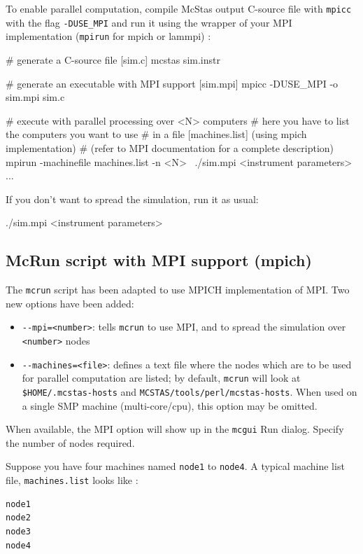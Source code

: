To enable parallel computation, compile McStas output C-source file
with \verb'mpicc' with the flag \verb'-DUSE_MPI' and run it using the
wrapper of your MPI implementation (\verb'mpirun' for mpich or lammpi) :
\begin{bash}
  # generate a C-source file [sim.c]
  mcstas sim.instr

  # generate an executable with MPI support [sim.mpi]
  mpicc -DUSE_MPI -o sim.mpi sim.c

  # execute with parallel processing over <N> computers
  # here you have to list the computers you want to use
  # in a file [machines.list] (using mpich implementation)
  # (refer to MPI documentation for a complete description)
  mpirun -machinefile machines.list -n <N> \
         ./sim.mpi <instrument parameters>
  ...
\end{bash}

If you don't want to spread the simulation, run it as usual:
\begin{bash}
  ./sim.mpi <instrument parameters>
\end{bash}

\subsection{McRun script with MPI support (mpich)}

The \verb'mcrun' script has been adapted to use MPICH implementation
of MPI. Two new options have been added:
\begin{itemize}
\item \verb'--mpi=<number>': tells \verb'mcrun' to use MPI, and to
  spread the simulation over \verb'<number>' nodes
\item \verb'--machines=<file>': defines a text file where the nodes which are to
  be used for parallel computation are listed; by default, \verb'mcrun' will
  look at \verb'$HOME/.mcstas-hosts' and
  \verb'MCSTAS/tools/perl/mcstas-hosts'. When used on a single SMP machine
  (multi-core/cpu), this option may be omitted.
\end{itemize}
When available, the MPI option will show up in the \verb+mcgui+ Run
dialog. Specify the number of nodes required.

Suppose you have four machines named \verb'node1' to \verb'node4'.
A typical machine list file, \verb'machines.list' looks like :
\begin{lstlisting}
node1
node2
node3
node4
\end{lstlisting}

